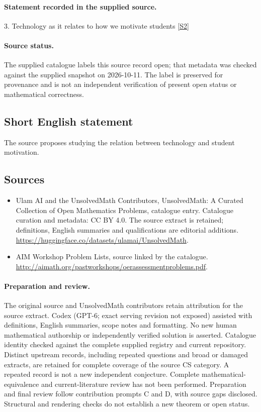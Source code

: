 \documentclass[11pt]{article}
\begin{document}
\paragraph{Statement recorded in the supplied source.}
3. Technology as it relates to how we motivate students \href{http://aimath.org/pastworkshops/oerassessmentproblems.pdf}{[S2]}
\paragraph{Source status.}
The supplied catalogue labels this source record open; that metadata was checked against the supplied snapshot on 2026-10-11. The label is preserved for provenance and is not an independent verification of present open status or mathematical correctness.
\subsection{Short English statement}
The source proposes studying the relation between technology and student motivation.
\subsection{Sources}
\begin{itemize}
\item[S1] Ulam AI and the UnsolvedMath Contributors, UnsolvedMath: A Curated Collection of Open Mathematics Problems, catalogue entry. Catalogue curation and metadata: CC BY 4.0. The source extract is retained; definitions, English summaries and qualifications are editorial additions.
\url{https://huggingface.co/datasets/ulamai/UnsolvedMath}.
\item[S2] AIM Workshop Problem Lists, source linked by the catalogue.
\url{http://aimath.org/pastworkshops/oerassessmentproblems.pdf}.
\end{itemize}
\paragraph{Preparation and review.}
The original source and UnsolvedMath contributors retain attribution for the source extract. Codex (GPT-6; exact serving revision not exposed) assisted with definitions, English summaries, scope notes and formatting. No new human mathematical authorship or independently verified solution is asserted. Catalogue identity checked against the complete supplied registry and current repository. Distinct upstream records, including repeated questions and broad or damaged extracts, are retained for complete coverage of the source CS category. A repeated record is not a new independent conjecture. Complete mathematical-equivalence and current-literature review has not been performed. Preparation and final review follow contribution prompts C and D, with source gaps disclosed. Structural and rendering checks do not establish a new theorem or open status.
\label{end:statement}
\end{document}
